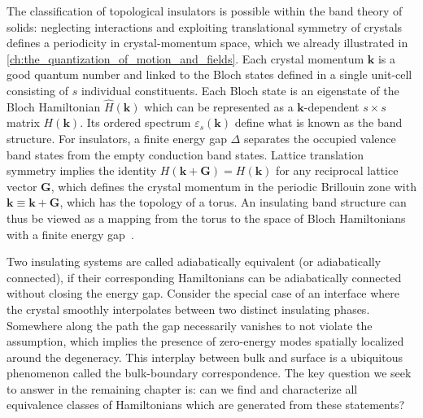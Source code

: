 The classification of topological insulators is possible within the band theory of solids: neglecting interactions and exploiting translational symmetry of crystals defines a periodicity in crystal-momentum space, which we already illustrated in \cref{ch:the_quantization_of_motion_and_fields}.
Each crystal momentum ${\bm k}$ is a good quantum number and linked to the Bloch states defined in a single unit-cell consisting of $s$ individual constituents.
Each Bloch state is an eigenstate of the Bloch Hamiltonian $\hat H(\bm k)$ which can be represented as a $\bm k$-dependent $s\times s$ matrix $H(\bm k)$.
Its ordered spectrum $\varepsilon_s(\bm k)$ define what is known as the band structure.
For insulators, a finite energy gap $\Delta$ separates the occupied valence band states from the empty conduction band states.
Lattice translation symmetry implies the identity $H(\bm k + \bm G) = H(\bm k)$ for any reciprocal lattice vector $\bm G$, which defines the crystal momentum in the periodic Brillouin zone with $\bm k\equiv \bm k+\bm G$, which has the topology of a torus.
An insulating band structure can thus be viewed as a mapping from the torus to the space of Bloch Hamiltonians with a finite energy gap~\cite{Kane2013}.

Two insulating systems are called adiabatically equivalent (or adiabatically connected), if their corresponding Hamiltonians can be adiabatically connected without closing the energy gap.
Consider the special case of an interface where the crystal smoothly interpolates between two distinct insulating phases.
Somewhere along the path the gap necessarily vanishes to not violate the assumption, which implies the presence of zero-energy modes spatially localized around the degeneracy.
This interplay between bulk and surface is a ubiquitous phenomenon called the bulk-boundary correspondence.
The key question we seek to answer in the remaining chapter is: can we find and characterize all equivalence classes of Hamiltonians which are generated from these statements?

